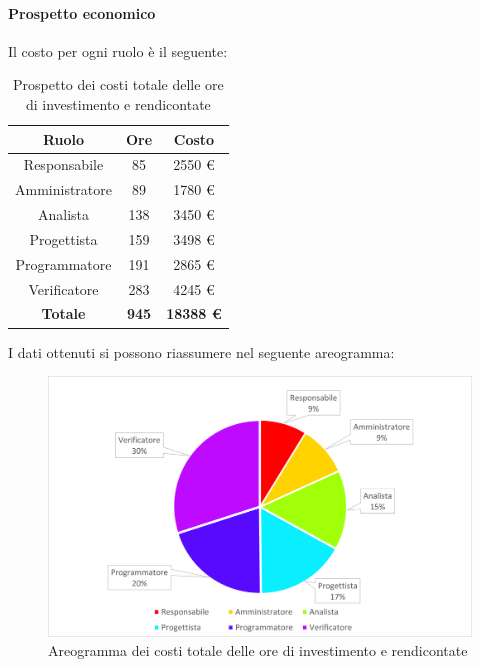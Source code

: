 \paragraph{Prospetto economico}
Il costo per ogni ruolo è il seguente:
\begin{table}[H]
		\begin{center}
			\setlength{\aboverulesep}{0pt}
			\setlength{\belowrulesep}{0pt}
			\setlength{\extrarowheight}{.75ex}
			\begin{tabular}{ c c c }
				\rowcolor{AzzurroGruppo!30} 
				\textbf{Ruolo} & \textbf{Ore} & \textbf{Costo}  \\
				\toprule
				Responsabile   & 85 & 2550 \euro \\
				Amministratore & 89 & 1780 \euro \\
				Analista       & 138 & 3450 \euro \\
				Progettista    & 159 & 3498 \euro \\
				Programmatore  & 191 & 2865 \euro \\
				Verificatore   & 283 & 4245 \euro \\
				\textbf{Totale} & \textbf{945} & \textbf{18388 \euro} \\
				\bottomrule
			\end{tabular}
			\caption{ Prospetto dei costi totale delle ore di investimento e rendicontate}
		\end{center}
	\end{table}
I dati ottenuti si possono riassumere nel seguente areogramma:
\begin{figure}[H]
    \centering
    \includegraphics[scale = 0.5]{components/img/Totale-non-rendicontate-torta.png}
    \caption{ Areogramma dei costi totale delle ore di investimento e rendicontate}
    \label{fig:Areogramma ripartizione ore totali di investimento e rendicontate}
\end{figure}
